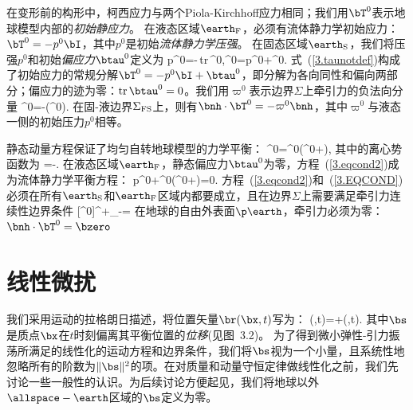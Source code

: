 在变形前的构形中，柯西应力与两个Piola-Kirchhoff应力相同；我们用$\bT^0$表示地球模型内部的{\em 初始静应力\/}。
%
%
%
%
%
%
%
%
在液态区域$\earth_{\rm F}$，必须有流体静力学初始应力：$\bT^0=-p^0\bI$，其中$p^0$是初始{\em 流体静力学压强}。
%
%
%
在固态区域$\earth_{\rm S}$，我们将压强$p^0$和初始{\em 偏应力\/}$\btau^0$定义为
%
%
\eq
\label{3.taunotdef}
p^0=-\third\,{\rm tr}\,\bT^0,\qquad\btau^0=p^0\bI+\bT^0.
\en
式~(\ref{3.taunotdef})构成了初始应力的常规分解$\bT^0=-p^0\bI+\btau^0$，即分解为各向同性和偏向两部分；偏应力的迹为零：${\rm tr}\,\btau^0=0$。我们用$\varpi^0$表示边界$\Sigma$上牵引力的负法向分量
\eq
\label{3.pinotdef}
\varpi^0=-(\bnh\cdot\bT^0\cdot\bnh).
\en
在固-液边界$\Sigma_{\rm FS}$上，则有$\bnh\cdot\bT^0=-\varpi^0\bnh$，其中$\varpi^0$与液态一侧的初始压力$p^0$相等。

静态动量方程保证了均匀自转地球模型的力学平衡：
%
%
%
\eq
\label{3.eqcond2}
\bdel\cdot\bT^0=\rho^0\bdel(\phi^0+\psi),
\en
其中的离心势函数为
\eq
\label{3.centpot}
\psi=-.
\en
%
%
在液态区域$\earth_{\rm F}$，静态偏应力$\btau^0$为零，方程~(\ref{3.eqcond2})成为流体静力学平衡方程：
%
%
\eq
\label{3.EQCOND}
\bdel p^0+\rho^0\bdel(\phi^0+\psi)=0.
\en
方程~(\ref{3.eqcond2})和~(\ref{3.EQCOND}) 必须在所有$\earth_{\rm S}$和$\earth_{\rm F}$区域内都要成立，且在边界$\Sigma$上需要满足牵引力连续性边界条件
\eq
\label{3.Tnotbc}
[\bnh\cdot\bT^0]^+_-=\bzero
\en
在地球的自由外表面$\p\earth$，牵引力必须为零：$\bnh\cdot\bT^0=\bzero$  
%
%

\section{线性微扰}


我们采用运动的拉格朗日描述，将位置矢量$\br(\bx,t)$写为：
\eq
\label{3.dispdef}
\br(\bx,t)=\bx+\bs(\bx,t).
\en
其中$\bs$是质点$\bx$在$t$时刻偏离其平衡位置的{\em 位移\/}(见图~3.2)。
%
%
为了得到微小弹性-引力振荡所满足的线性化的运动方程和边界条件，我们将$\bs$视为一个小量，且系统性地忽略所有的阶数为$\|\bs\|^2$的项。在对质量和动量守恒定律做线性化之前，我们先讨论一些一般性的认识。为后续讨论方便起见，我们将地球以外$\allspace - \earth$区域的$\bs$定义为零。

